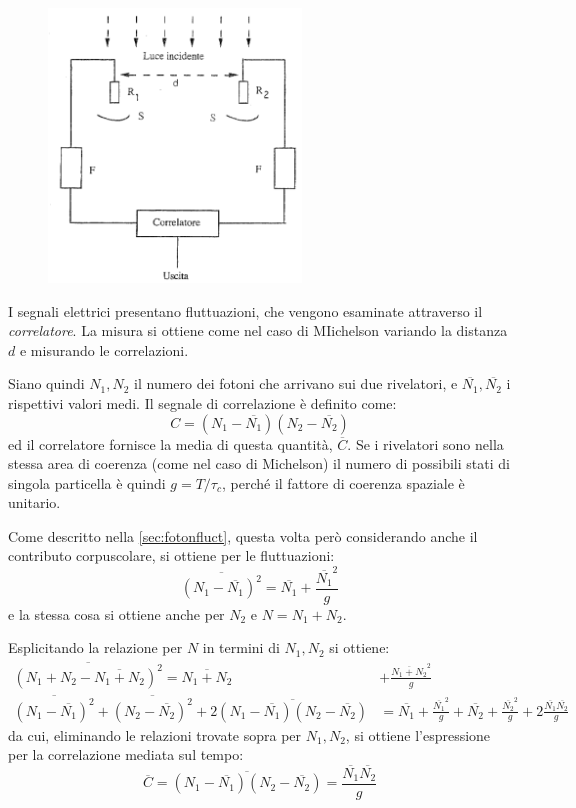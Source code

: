 \begin{figure}[t]
	\centering
	\includegraphics[width=0.6\textwidth]{Immagini/HanburyBrownTwiss.png}
	\vspace{-10pt}
	\caption{}
	\label{fig:hbrowntwiss}
	\vspace{-10pt}
\end{figure}

I segnali elettrici presentano fluttuazioni, che vengono esaminate attraverso il \textit{correlatore}. La misura si ottiene come nel caso di MIichelson variando la distanza $ d $ e misurando le correlazioni.

Siano quindi $ N_1, N_2 $ il numero dei fotoni che arrivano sui due rivelatori, e $ \overline{N_1}, \overline{N_2} $ i rispettivi valori medi. Il segnale di correlazione è definito come:
\[ C = (N_1 - \overline{N_1})  (N_2 - \overline{N_2}) \]
ed il correlatore fornisce la media di questa quantità, $ \overline{C} $. Se i rivelatori sono nella stessa area di coerenza (come nel caso di Michelson) il numero di possibili stati di singola particella è quindi $ g = T/\tau_c $, perché il fattore di coerenza spaziale è unitario.

Come descritto nella \cref{sec:fotonfluct}, questa volta però considerando anche il contributo corpuscolare, si ottiene per le fluttuazioni:
\[ \overline{(N_1 - \overline{N_1})^2} = \overline{N_1} + \frac{\overline{N_1}^2}{g} \]
e la stessa cosa si ottiene anche per $ N_2 $ e $ N = N_1 + N_2 $.

Esplicitando la relazione per $ N $ in termini di $ N_1,N_2 $ si ottiene:
\begin{align*}
\overline{(N_1 + N_2 - \overline{N_1 + N_2})^2} = \overline{N_1 + N_2} &+ \frac{\overline{N_1 + N_2}^2}{g}\\
\overline{(N_1 - \overline{N_1})^2} + \overline{(N_2 - \overline{N_2})^2} + 2 \overline{(N_1 - \overline{N_1})(N_2 - \overline{N_2})}& = \overline{N_1} + \frac{\overline{N_1}^2}{g} + \overline{N_2} + \frac{\overline{N_2}^2}{g} + 2 \frac{\overline{N_1}\overline{N_2}}{g}
\end{align*}
da cui, eliminando le relazioni trovate sopra per $ N_1, N_2 $, si ottiene l'espressione per la correlazione mediata sul tempo:
\[ \overline{C} = \overline{(N_1 - \overline{N_1})  (N_2 - \overline{N_2})} = \frac{\overline{N_1}\overline{N_2}}{g} \]

